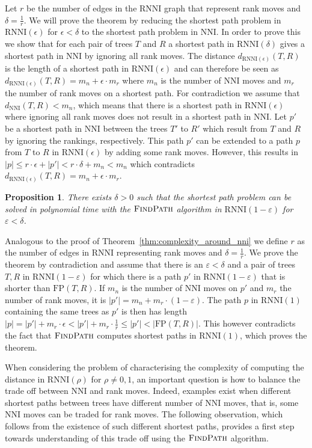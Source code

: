 \documentclass[11pt]{amsart}
\newtheorem{proposition}{Proposition}
\newcommand{\rnni}{\mathrm{RNNI}}
\newcommand{\findpath}{\textsc{FindPath}}
\newcommand{\nni}{\mathrm{NNI}}
\newcommand{\fp}{\mathrm{FP}}
\newcommand{\summary}[1]{} %
\begin{document}
\proof
Let $r$ be the number of edges in the $\rnni$ graph that represent rank moves and $\delta = \frac{1}{r}$.
We will prove the theorem by reducing the shortest path problem in $\rnni(\epsilon)$ for $\epsilon < \delta$ to the shortest path problem in $\nni$.
In order to prove this we show that for each pair of trees $T$ and $R$ a shortest path in $\rnni(\delta)$ gives a shortest path in $\nni$ by ignoring all rank moves.
The distance $d_{\rnni(\epsilon)}(T,R)$ is the length of a shortest path in $\rnni(\epsilon)$ and can therefore be seen as $d_{\rnni(\epsilon)}(T,R) = m_n + \epsilon \cdot m_r$ where $m_n$ is the number of $\nni$ moves and $m_r$ the number of rank moves on a shortest path.
For contradiction we assume that $d_{\nni}(T,R) < m_n$, which means that there is a shortest path in $\rnni(\epsilon)$ where ignoring all rank moves does not result in a shortest path in $\nni$.
Let $p'$ be a shortest path in $\nni$ between the trees $T'$ to $R'$ which result from $T$ and $R$ by ignoring the rankings, respectively.
This path $p'$ can be extended to a path $p$ from $T$ to $R$ in $\rnni(\epsilon)$ by adding some rank moves.
However, this results in $|p| \leq r \cdot \epsilon + |p'| < r \cdot \delta + m_n < m_n$ which contradicts $d_{\rnni(\epsilon)}(T,R) = m_n + \epsilon \cdot m_r$.
\endproof

\begin{proposition}
There exists $\delta > 0$ such that the shortest path problem can be solved in polynomial time with the $\findpath$ algorithm in $\rnni(1-\varepsilon)$ for $\varepsilon < \delta$.
\end{proposition}

\proof
Analogous to the proof of Theorem~\ref{thm:complexity_around_nni} we define $r$ as the number of edges in $\rnni$ representing rank moves and $\delta = \frac{1}{r}$.
We prove the theorem by contradiction and assume that there is an $\varepsilon < \delta$ and a pair of trees $T,R$ in $\rnni(1-\varepsilon)$ for which there is a path $p'$ in $\rnni(1-\varepsilon)$ that is shorter than $\fp(T,R)$.
If $m_n$ is the number of $\nni$ moves on $p'$ and $m_r$ the number of rank moves, it is $|p'| = m_n + m_r \cdot (1 - \varepsilon)$.
The path $p$ in $\rnni(1)$ containing the same trees as $p'$ is then has length $|p| = |p'| + m_r \cdot \epsilon < |p'| + m_r \cdot \frac{1}{r} \leq |p'| < |\fp(T,R)|$.
This however contradicts the fact that $\findpath$ computes shortest paths in $\rnni(1)$, which proves the theorem.
\endproof

\summary{Rank moves and $\nni$ moves can appear in different proportions on shortest paths and this is related to $\fp$ not computing shortest paths if $\rho \neq 1$}
When considering the problem of characterising the complexity of computing the distance in $\rnni(\rho)$ for $\rho \neq 0,1$, an important question is how to balance the trade off between $\nni$ and rank moves.
Indeed, examples exist when different shortest paths between trees have different number of $\nni$ moves, that is, some $\nni$ moves can be traded for rank moves.
The following observation, which follows from the existence of such different shortest paths, provides a first step towards understanding of this trade off using the $\findpath$ algorithm.
\end{document}
